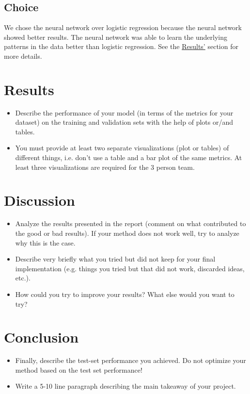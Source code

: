 \documentclass[a4, 10 pt, conference]{ieeeconf}  %
\begin{document}
\subsection{Choice}
We chose the neural network over logistic regression because the neural network showed better results. The neural network was able to learn the underlying patterns in the data better than logistic regression.
See the \hyperref[sec:results]{Results'} section for more details.

\section{Results}
\label{sec:results}

{\color{blue}

  \begin{itemize}
    \item Describe the performance of your model (in terms of the metrics for your dataset) on the training and validation sets with the help of plots or/and tables.
    \item You must provide at least two separate visualizations
          (plot or tables) of different things, i.e. don’t use a table
          and a bar plot of the same metrics. At least three
          visualizations are required for the 3 person team.
  \end{itemize}
}

\section{Discussion}
\label{sec:discuss}

{\color{blue}
  \begin{itemize}
    \item Analyze the results presented in the report (comment on what contributed to the good or bad results). If your method does not work well, try to analyze why this is the case.
    \item Describe very briefly what you tried but did not keep for your final implementation (e.g. things you tried but that did not work, discarded ideas, etc.).
    \item How could you try to improve your results? What else would you want to try?

  \end{itemize}
}


\section{Conclusion}
\label{sec:con}

{\color{blue}

  \begin{itemize}
    \item Finally, describe the test-set performance you achieved. Do not
          optimize your method based on the test set performance!
    \item Write a 5-10 line paragraph describing the main takeaway of your project.
  \end{itemize}

}

\end{document}
